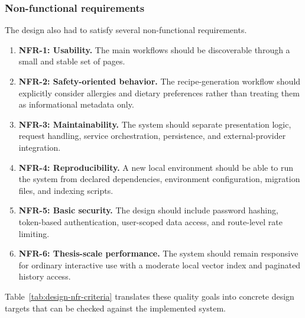 \subsubsection{Non-functional requirements}

The design also had to satisfy several non-functional requirements.

\begin{enumerate}
	\item \textbf{NFR-1: Usability.} The main workflows should be
	discoverable through a small and stable set of pages.
	\item \textbf{NFR-2: Safety-oriented behavior.} The recipe-generation
	workflow should explicitly consider allergies and dietary preferences
	rather than treating them as informational metadata only.
	\item \textbf{NFR-3: Maintainability.} The system should separate
	presentation logic, request handling, service orchestration,
	persistence, and external-provider integration.
	\item \textbf{NFR-4: Reproducibility.} A new local environment should
	be able to run the system from declared dependencies, environment
	configuration, migration files, and indexing scripts.
	\item \textbf{NFR-5: Basic security.} The design should include
	password hashing, token-based authentication, user-scoped data access,
	and route-level rate limiting.
	\item \textbf{NFR-6: Thesis-scale performance.} The system should
	remain responsive for ordinary interactive use with a moderate local
	vector index and paginated history access.
\end{enumerate}

Table~\ref{tab:design-nfr-criteria} translates these quality goals into
concrete design targets that can be checked against the implemented
system.

